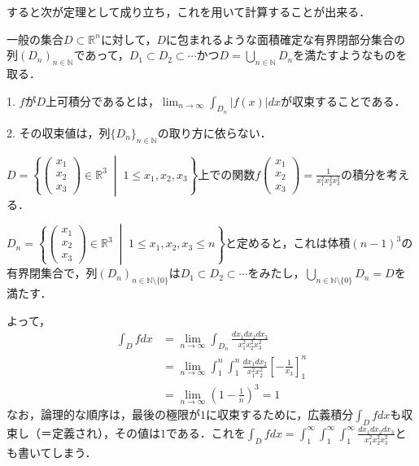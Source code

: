 \documentclass[uplatex, dvipdfmx]{jsreport}
\begin{document}
すると次が定理として成り立ち，これを用いて計算することが出来る．
\begin{theorem*}
    一般の集合$D\subset\mathbb{R}^n$に対して，$D$に包まれるような面積確定な有界閉部分集合の列$(D_n)_{n\in\mathbb{N}}$であって，$D_1\subset D_2\subset\cdots$かつ$D=\bigcup_{n\in\mathbb{N}}D_n$を満たすようなものを取る．

    1. $f$が$D$上可積分であるとは，$\lim_{n\to\infty}\int_{D_n}|f(x)|dx$が収束することである．

    2. その収束値は，列$\{D_n\}_{n\in\mathbb{N}}$の取り方に依らない．
\end{theorem*}
\begin{example*}
    $D=\left\{\begin{pmatrix}x_1\\x_2\\x_3\end{pmatrix}\in\mathbb{R}^3\;\middle|\; 1\le x_1,x_2,x_3\right\}$上での関数$f\begin{pmatrix}x_1\\x_2\\x_3\end{pmatrix}=\frac{1}{x_1^2x_2^2x_3^2}$の積分を考える．

    $D_n=\left\{\begin{pmatrix}x_1\\x_2\\x_3\end{pmatrix}\in\mathbb{R}^3\;\middle|\; 1\le x_1,x_2,x_3\le n\right\}$と定めると，これは体積$(n-1)^3$の有界閉集合で，列$(D_n)_{n\in\mathbb{N}\setminus\{0\}}$は$D_1\subset D_2\subset\cdots$をみたし，$\bigcup_{n\in\mathbb{N}\setminus\{0\}}D_n=D$を満たす．

    よって，
    \begin{align*}
        \int_Dfdx &= \lim_{n\to\infty}\int_{D_n}\frac{dx_1dx_2dx_3}{x_1^2x_2^2x_3^2} \\
        &= \lim_{n\to\infty}\int_1^n\int^n_1\frac{dx_1dx_2}{x_1^2x_2^2}\left[ -\frac{1}{x_3} \right]^n_1 \\
        &= \lim_{n\to\infty}\left( 1-\frac{1}{n} \right)^3 = 1
    \end{align*}
    なお，論理的な順序は，最後の極限が$1$に収束するために，広義積分$\int_Dfdx$も収束し（＝定義され），その値は$1$である．これを$\int_Dfdx=\int^\infty_1\int^\infty_1\int^\infty_1\frac{dx_1dx_2dx_3}{x_1^2x_2^2x_3^2}$とも書いてしまう．
\end{example*}
\end{document}
